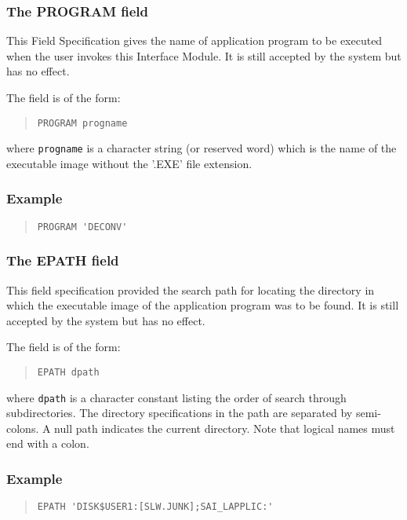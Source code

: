 \documentclass[twoside,11pt]{article}
\renewcommand{\_}{\texttt{\symbol{95}}}
\begin{document}
\subsubsection{The PROGRAM field}
This Field Specification gives the name of application program to be executed
when the user invokes this Interface Module.
It is still accepted by the system but has no effect.

The field is of the form:
\begin{quote} \begin{verbatim}
PROGRAM progname
\end{verbatim} \end{quote}
where \texttt{progname} is a character string (or reserved word) which is
the name of the executable image without the '.EXE' file extension.

\subsubsection*{Example}
\begin{quote} \begin{verbatim}
PROGRAM 'DECONV'
\end{verbatim} \end{quote}

\subsubsection{The EPATH field}
This field specification provided the search path for locating the
directory in which the executable image of the application program was to be
found.
It is still accepted by the system but has no effect.

The field is of the form:
\begin{quote} \begin{verbatim}
EPATH dpath
\end{verbatim} \end{quote}
where \texttt{dpath} is a character constant listing the order of search through
subdirectories. The directory specifications in the path are separated
by semi-colons. A null path indicates the current directory. Note that
logical names must end with a colon.

\subsubsection*{Example}
\begin{quote} \begin{verbatim}
EPATH 'DISK$USER1:[SLW.JUNK];SAI_LAPPLIC:'
\end{verbatim} \end{quote}
\end{document}
